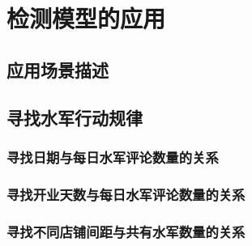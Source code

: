
\chapter{检测模型的应用}
\label{chap:appli}



\section{应用场景描述}





\section{寻找水军行动规律}





\subsection{寻找日期与每日水军评论数量的关系}





\subsection{寻找开业天数与每日水军评论数量的关系}





\subsection{寻找不同店铺间距与共有水军数量的关系}



